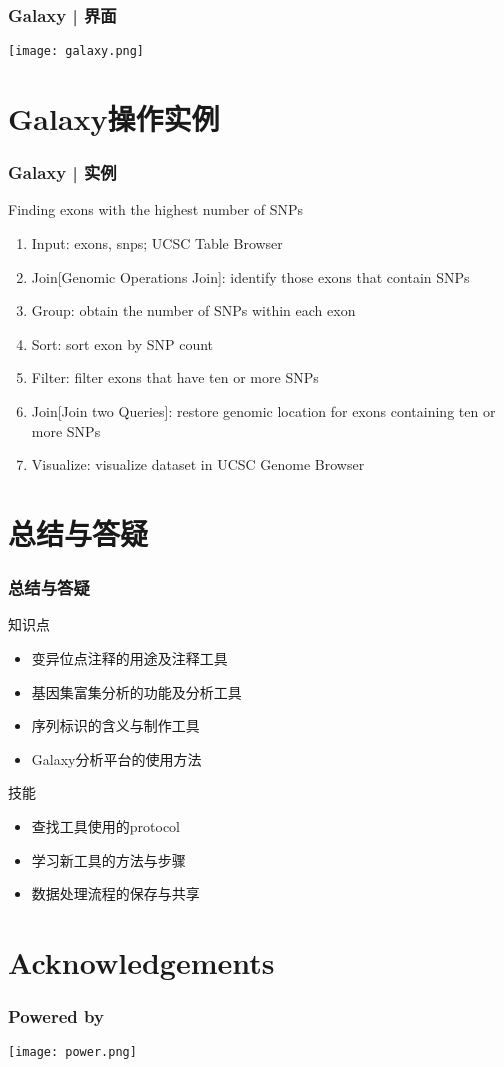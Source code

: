 \begin{frame}
	\frametitle{Galaxy | 界面}
	\begin{center}
		\texttt{[image: galaxy.png]}
	\end{center}
\end{frame}

\section{Galaxy操作实例}
\begin{frame}
	\frametitle{Galaxy | 实例}
	\begin{block}{Finding exons with the highest number of SNPs}
	\begin{enumerate}[<+-|alert@+>]
		\item Input: exons, snps; UCSC Table Browser
		\item Join[Genomic Operations Join]: identify those exons that contain SNPs
		\item Group: obtain the number of SNPs within each exon
		\item Sort: sort exon by SNP count
		\item Filter: filter exons that have ten or more SNPs
		\item Join[Join two Queries]: restore genomic location for exons containing ten or more SNPs
		\item Visualize: visualize dataset in UCSC Genome Browser
	\end{enumerate}
	\end{block}
\end{frame}


\section{总结与答疑}
\begin{frame}
	\frametitle{总结与答疑}
	\begin{block}{知识点}
		\begin{itemize}
			\item 变异位点注释的用途及注释工具
			\item 基因集富集分析的功能及分析工具
			\item 序列标识的含义与制作工具
			\item Galaxy分析平台的使用方法
		\end{itemize}
	\end{block}
	\begin{block}{技能}
		\begin{itemize}
			\item 查找工具使用的protocol
			\item 学习新工具的方法与步骤
			\item 数据处理流程的保存与共享
		\end{itemize}
	\end{block}
\end{frame}

\section*{Acknowledgements}
\begin{frame}
	\frametitle{Powered by}
	\begin{center}
		\texttt{[image: power.png]}
	\end{center}
\end{frame}


